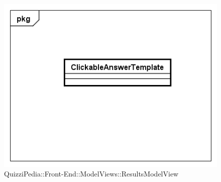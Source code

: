 	\begin{figure}[ht]
		\centering
		\includegraphics[scale=0.5,keepaspectratio]{UML/Classi/Front-End/QuizziPedia_Front-end_Templates_ClickableAnswerTemplate.png}
		\caption{QuizziPedia::Front-End::ModelViews::ResultsModelView}
	\end{figure} \FloatBarrier
	
